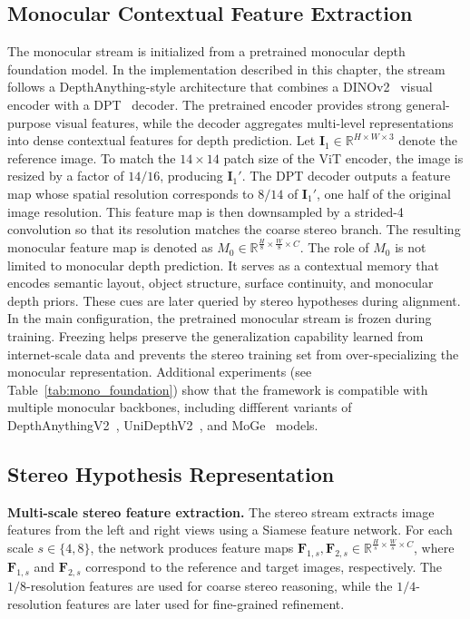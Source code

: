 \subsection{Monocular Contextual Feature Extraction}
The monocular stream is initialized from a pretrained monocular depth foundation model.
In the implementation described in this chapter, the stream follows a  DepthAnything-style architecture that combines a DINOv2~\cite{oquab2023dinov2} visual encoder with a DPT~\cite{ranftl2021vision} decoder.
The pretrained encoder provides strong general-purpose visual features, while the decoder aggregates multi-level representations into dense contextual features for depth prediction.
Let $\bm{I}_1 \in \mathbb{R}^{H \times W \times 3}$ denote the reference image.
To match the $14\times 14$ patch size of the ViT encoder, the image is resized by a factor of $14/16$, producing $\bm{I}_1'$.
The DPT decoder outputs a feature map whose spatial resolution corresponds to $8/14$ of $\bm{I}_1'$, \ie one half of the original image resolution.
This feature map is then downsampled by a strided-4 convolution so that its resolution matches the coarse stereo branch.
The resulting monocular feature map is denoted as
$M_0 \in \mathbb{R}^{\frac{H}{8} \times \frac{W}{8} \times C}$.
The role of $M_0$ is not limited to monocular depth prediction. 
It serves as a contextual memory that encodes semantic layout, object structure, surface continuity, and monocular depth priors. 
These cues are later queried by stereo hypotheses during alignment.
In the main configuration, the pretrained monocular stream is frozen during training.
Freezing helps preserve the generalization capability learned from internet-scale data and prevents the stereo training set from over-specializing the monocular representation.
Additional experiments (see Table~\ref{tab:mono_foundation}) show that the framework is compatible with multiple monocular backbones, including diffferent variants of DepthAnythingV2~\cite{yang2024depth}, UniDepthV2~\cite{piccinelli2025unidepthv2}, and MoGe~\cite{wang2025moge,wang2025moge2} models.

\subsection{Stereo Hypothesis Representation}
\noindent\textbf{Multi-scale stereo feature extraction.}
The stereo stream extracts image features from the left and right views using a Siamese feature network.
For each scale $s \in \{4,8\}$, the network produces feature maps $\bm{F}_{1,s}, \bm{F}_{2,s} \in \mathbb{R}^{\frac{H}{s} \times \frac{W}{s} \times C}$, where $\bm{F}_{1,s}$ and $\bm{F}_{2,s}$ correspond to the reference and target images, respectively.
The $1/8$-resolution features are used for coarse stereo reasoning, while the $1/4$-resolution features are later used for fine-grained refinement.

